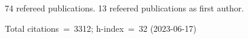 74 refereed publications. 13 refeered publications as first author.

Total citations~=~3312; h-index~=~32 (2023-06-17)